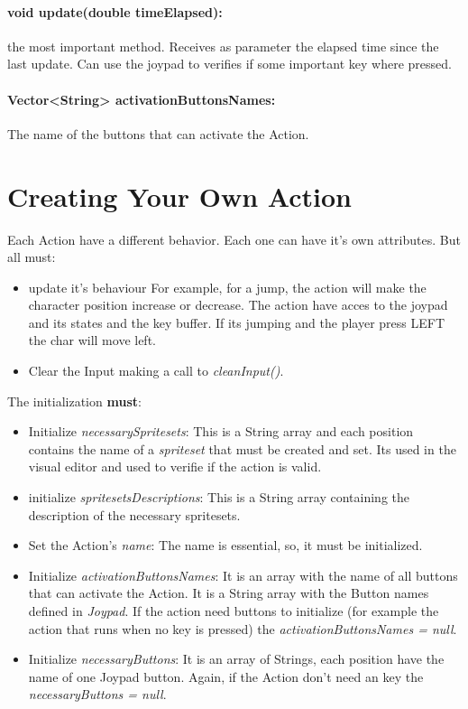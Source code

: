 	\paragraph{void update(double timeElapsed): }  the most important method. Receives as parameter the elapsed time since the last update. Can use the joypad to verifies if some important key where pressed.
	\paragraph{Vector<String> activationButtonsNames:} The name of the buttons that can activate the Action.
	
	
	
	\section{Creating Your Own Action}
	Each Action have a different behavior. Each one can have it's own attributes. But all must:
	
	\begin{itemize}
	\item {update it's behaviour} For example, for a jump, the action will make the character position increase or decrease. The action have acces to the joypad and its states and the key buffer. If its jumping and the player press LEFT the char will move left.
	\item{Clear the Input } making a call to \emph{cleanInput()}.
	\end{itemize}
	
	The initialization \textbf{must}:
	\begin{itemize}
	\item {Initialize \emph{necessarySpritesets}:} This is a String array and each position contains the name of a \emph{spriteset} that must be created and set. Its used in the visual editor and used to verifie if the action is valid.
	\item{initialize \emph{spritesetsDescriptions}:} This is a String array containing the description of the necessary spritesets.
	\item{Set the Action's \emph{name}:} The name is essential, so, it must be initialized.
	\item{Initialize \emph{activationButtonsNames}:} It is an array with the name of all buttons that can activate the Action. It is a String array with the Button names defined in \emph{Joypad}. If the action need buttons to initialize (for example the action that runs when no key is pressed) the \emph{activationButtonsNames = null}.
	\item{Initialize \emph{necessaryButtons}:} It is an array of Strings, each position have the name of one Joypad button. Again, if the Action don't need an key the \emph{necessaryButtons = null}.
	\end{itemize}